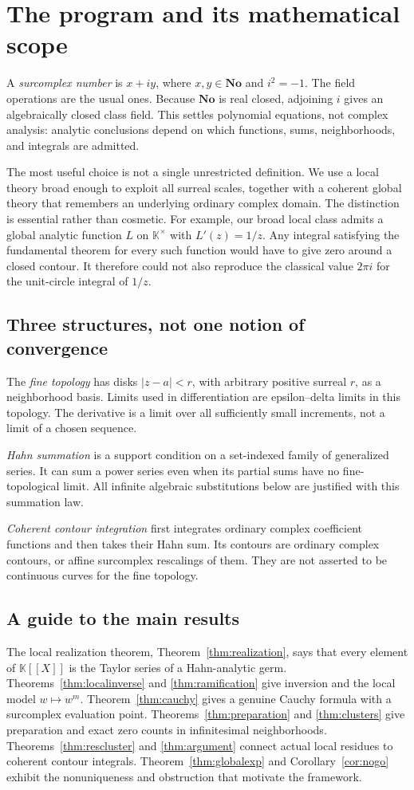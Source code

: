 \documentclass[11pt,a4paper]{article}
\numberwithin{equation}{section}
\theoremstyle{definition}
\theoremstyle{remark}
\newcommand{\No}{\mathbf{No}}
\newcommand{\K}{\mathbb K}
\newcommand{\abs}[1]{\left|#1\right|}
\begin{document}
\section{The program and its mathematical scope}
\label{sec:program}
A \emph{surcomplex number} is $x+iy$, where $x,y\in\No$ and $i^2=-1$. The field operations are the usual ones. Because $\No$ is real closed, adjoining $i$ gives an algebraically closed class field. This settles polynomial equations, not complex analysis: analytic conclusions depend on which functions, sums, neighborhoods, and integrals are admitted.

The most useful choice is not a single unrestricted definition. We use a local theory broad enough to exploit all surreal scales, together with a coherent global theory that remembers an underlying ordinary complex domain. The distinction is essential rather than cosmetic. For example, our broad local class admits a global analytic function $L$ on $\K^\times$ with $L'(z)=1/z$. Any integral satisfying the fundamental theorem for every such function would have to give zero around a closed contour. It therefore could not also reproduce the classical value $2\pi i$ for the unit-circle integral of $1/z$.

\subsection{Three structures, not one notion of convergence}
The \emph{fine topology} has disks $\abs{z-a}<r$, with arbitrary positive surreal $r$, as a neighborhood basis. Limits used in differentiation are epsilon--delta limits in this topology. The derivative is a limit over all sufficiently small increments, not a limit of a chosen sequence.

\emph{Hahn summation} is a support condition on a set-indexed family of generalized series. It can sum a power series even when its partial sums have no fine-topological limit. All infinite algebraic substitutions below are justified with this summation law.

\emph{Coherent contour integration} first integrates ordinary complex coefficient functions and then takes their Hahn sum. Its contours are ordinary complex contours, or affine surcomplex rescalings of them. They are not asserted to be continuous curves for the fine topology.

\subsection{A guide to the main results}
The local realization theorem, Theorem~\ref{thm:realization}, says that every element of $\K[[X]]$ is the Taylor series of a Hahn-analytic germ. Theorems~\ref{thm:localinverse} and \ref{thm:ramification} give inversion and the local model $w\mapsto w^m$. Theorem~\ref{thm:cauchy} gives a genuine Cauchy formula with a surcomplex evaluation point. Theorems~\ref{thm:preparation} and \ref{thm:clusters} give preparation and exact zero counts in infinitesimal neighborhoods. Theorems~\ref{thm:rescluster} and \ref{thm:argument} connect actual local residues to coherent contour integrals. Theorem~\ref{thm:globalexp} and Corollary~\ref{cor:nogo} exhibit the nonuniqueness and obstruction that motivate the framework.
\end{document}
